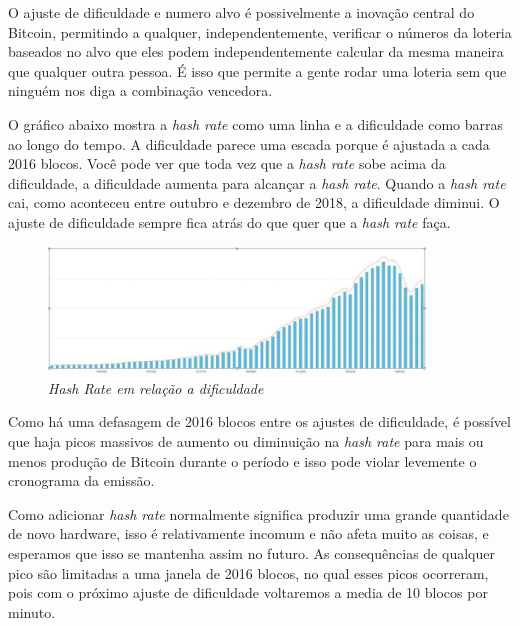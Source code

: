 O ajuste de dificuldade e numero alvo é possivelmente a inovação central do Bitcoin, permitindo a qualquer, independentemente, verificar o números da loteria baseados no alvo que eles podem independentemente calcular da mesma maneira que qualquer outra pessoa. É isso que permite a gente rodar uma loteria sem que ninguém nos diga a combinação vencedora.




O gráfico abaixo mostra a \textit{hash rate} como uma linha e a dificuldade como barras ao longo do tempo. A dificuldade parece uma escada porque é ajustada a cada 2016 blocos. Você pode ver que toda vez que a \textit{hash rate} sobe acima da dificuldade, a dificuldade aumenta para alcançar a \textit{hash rate}. Quando a \textit{hash rate} cai, como aconteceu entre outubro e dezembro de 2018, a dificuldade diminui. O ajuste de dificuldade sempre fica atrás do que quer que a \textit{hash rate} faça.

\begin{figure}
  \centering
  \includegraphics[width=10cm]{imagens/grafico3-capitulo-05.jpg}
  \caption*{\textit{\small Hash Rate em relação a dificuldade}}
\end{figure}

Como há uma defasagem de 2016 blocos entre os ajustes de dificuldade, é possível que haja picos massivos de aumento ou diminuição na \textit{hash rate} para mais ou menos produção de Bitcoin durante o período e isso pode violar levemente o cronograma da emissão.



Como adicionar \textit{hash rate} normalmente significa produzir uma grande quantidade de novo hardware, isso é relativamente incomum e não afeta muito as coisas, e esperamos que isso se mantenha assim no futuro.
As consequências de qualquer pico são limitadas a uma janela de 2016 blocos, no qual esses picos ocorreram, pois com o próximo ajuste de dificuldade voltaremos a media de 10 blocos por minuto.



